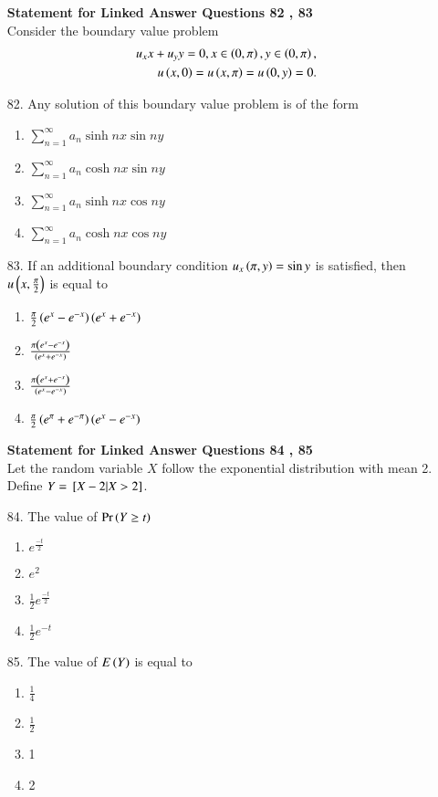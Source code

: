 \documentclass[journal,12pt,onecolumn]{IEEEtran}
\theoremstyle{remark}
\begin{document}
\begin{enumerate}
\textbf{Statement for Linked Answer Questions 82 , 83}\\
Consider the boundary value problem
\begin{align}
    u_xx + u_yy = 0, x \in \left(0, \pi\right), y \in \left(0, \pi\right), \\
    u\left(x, 0\right) = u\left(x, \pi\right) = u\left(0, y\right) = 0.
\end{align}
\item[82.] Any solution of this boundary value problem is of the form
		\hfill{}
		\begin{enumerate}
            \item $\sum_{n = 1}^{\infty} a_n \sinh nx \sin ny$ 
            \item $\sum_{n = 1}^{\infty} a_n \cosh nx \sin ny$ 
			\item $\sum_{n = 1}^{\infty} a_n \sinh nx \cos ny$ 
		\item $\sum_{n = 1}^{\infty} a_n \cosh nx \cos ny$ 
		\end{enumerate}
\item[83.] If an additional boundary condition $u_x\left(\pi, y\right) = \sin y$ is satisfied, then 
    $u\left(x, \frac{\pi}{2}\right)$ is equal to
		\hfill{}
		\begin{enumerate}
            \item $\frac{\pi}{2}\left(e^x - e^{-x}\right)\left(e^x + e^{-x}\right)$ 
            \item $\frac{\pi\left(e^x - e^{-x}\right)}{\left(e^x + e^{-x}\right)}$ 
            \item $\frac{\pi\left(e^x + e^{-x}\right)}{\left(e^x - e^{-x}\right)}$ 
            \item $\frac{\pi}{2}\left(e^{\pi} + e^{-\pi}\right)\left(e^x - e^{-x}\right)$ 
		\end{enumerate}
\textbf{Statement for Linked Answer Questions 84 , 85}\\
Let the random variable $X$ follow the exponential distribution with mean 2. Define
$Y = {}\left[X - 2 | X > 2\right]$.
\item[84.] The value of $\Pr{\ensuremath{\left(Y \ge t\right)}}$
		\hfill{}
		\begin{enumerate}
            \item $e ^ {\frac{-t}{2}}$ 
            \item $e ^ {2}$ 
            \item $\frac{1}{2}e ^ {\frac{-t}{2}}$ 
            \item $\frac{1}{2}e ^ {-t}$ 
		\end{enumerate}
\item[85.] The value of $E\left(Y\right)$ is equal to
		\hfill{}
		\begin{enumerate}
            \item $\frac{1}{4}$ 
            \item $\frac{1}{2}$ 
            \item 1
            \item 2
		\end{enumerate}

\end{enumerate}
\end{document}
